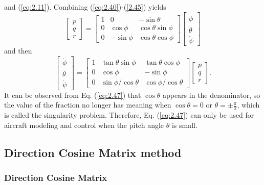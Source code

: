 and (\ref{eq:2.11}). Combining (\ref{eq:2.40})-(\ref{2.45}) yields
\begin{equation}
\left[\begin{array}{c}
p\\
q\\
r
\end{array}\right]=\left[\begin{array}{ccc}
1 & 0 & -\sin\theta\\
0 & \cos\phi & \cos\theta\sin\phi\\
0 & -\sin\phi & \cos\theta\cos\phi
\end{array}\right]\left[\begin{array}{c}
\dot{\phi}\\
{\dot{\theta}}\\
{\dot{\psi}}
\end{array}\right]\label{eq:2.46}
\end{equation}
and then
\begin{equation}
\left[\begin{array}{c}
\dot{\phi}\\
{\dot{\theta}}\\
{\dot{\psi}}
\end{array}\right]=\left[\begin{array}{ccc}
1 & \tan\theta\sin\phi & \tan\theta\cos\phi\\
0 & \cos\phi & -\sin\phi\\
0 & {\sin\phi}/{\cos\theta} & {\cos\phi}/{\cos\theta}
\end{array}\right]\left[\begin{array}{c}
p\\
q\\
r
\end{array}\right].\label{eq:2.47}
\end{equation}
It can be observed from Eq. (\ref{eq:2.47}) that $\cos\theta$ appears
in the denominator, so the value of the fraction no longer has meaning
when $\cos\theta=0$ or $\theta=\pm\frac{\pi}{2}$, which is called
the singularity problem. Therefore, Eq. (\ref{eq:2.47}) can only
be used for aircraft modeling and control when the pitch angle $\theta$
is small.

\subsection{Direction Cosine Matrix method}

\subsubsection{Direction Cosine Matrix }

